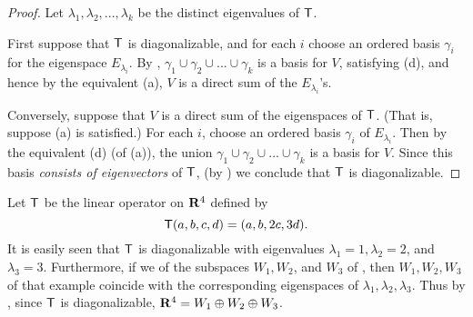 \begin{proof}
Let \(\lambda_1, \lambda_2, ..., \lambda_k\) be the distinct eigenvalues of \(\textsf{T}\).

First suppose that \(\textsf{T}\) is diagonalizable, and for each \(i\) choose an ordered basis \(\gamma_i\) for the eigenspace \(E_{\lambda_i}\).
By , \(\gamma_1 \cup \gamma_2 \cup ... \cup \gamma_k\) is a basis for \(V\), satisfying (d), and hence by the equivalent (a), \(V\) is a direct sum of the \(E_{\lambda_i}\)'s.

Conversely, suppose that \(V\) is a direct sum of the eigenspaces of \(\textsf{T}\).
(That is, suppose (a) is satisfied.)
For each \(i\), choose an ordered basis \(\gamma_i\) of \(E_{\lambda_i}\).
Then by the equivalent (d) (of (a)), the union \(\gamma_1 \cup \gamma_2 \cup ... \cup \gamma_k\) is a basis for \(V\).
Since this basis \emph{consists of eigenvectors} of \(\textsf{T}\), (by ) we conclude that \(\textsf{T}\) is diagonalizable.
\end{proof}

\begin{example} \label{example 5.2.10}
Let \(\textsf{T}\) be the linear operator on \(\mathbf{R}^4\) defined by
\[
    \textsf{T}(a, b, c, d) = (a, b, 2c, 3d).
\]
It is easily seen that \(\textsf{T}\) is diagonalizable with eigenvalues \(\lambda_1 = 1, \lambda_2 = 2\), and \(\lambda_3 = 3\).
Furthermore, if we  of the subspaces \(W_1, W_2\), and \(W_3\) of , then \(W_1, W_2, W_3\) of that example coincide with the corresponding eigenspaces of \(\lambda_1, \lambda_2, \lambda_3\).
Thus by , since \(\textsf{T}\) is diagonalizable, \(\mathbf{R}^4 = W_1 \oplus W_2 \oplus W_3\).
\end{example}
